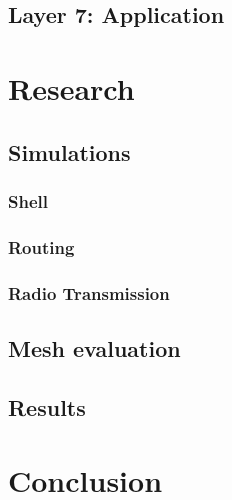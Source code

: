 \section{Layer 7: Application}

\chapter{Research}
\section{Simulations}
\subsection{Shell}
\subsection{Routing}
\subsection{Radio Transmission}
\section{Mesh evaluation}
\section{Results}

\chapter{Conclusion}
